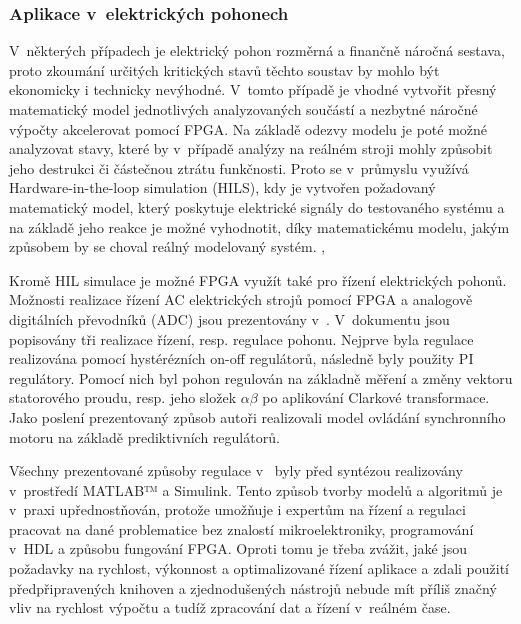 \documentclass[a4paper, twoside, 11pt]{article}
\begin{document}
			\subsubsection{Aplikace v~elektrických pohonech}
			V~některých případech je elektrický pohon rozměrná a finančně náročná sestava, proto zkoumání určitých kritických stavů těchto soustav by mohlo být ekonomicky i technicky nevýhodné. V~tomto případě je vhodné vytvořit přesný matematický model jednotlivých analyzovaných součástí a nezbytné náročné výpočty akcelerovat pomocí FPGA. Na základě odezvy modelu je poté možné analyzovat stavy, které by v~případě analýzy na reálném stroji mohly způsobit jeho destrukci či částečnou ztrátu funkčnosti. Proto se v~průmyslu využívá Hardware-in-the-loop simulation (HILS), kdy je vytvořen požadovaný matematický model, který poskytuje elektrické signály do testovaného systému a na základě jeho reakce je možné vyhodnotit, díky matematickému modelu, jakým způsobem by se choval reálný modelovaný systém. \cite{andina-advanced-features-and-industrial-applications-of-fpga}, \cite{mathworks-discovery-hil-simulation}\par
			Kromě HIL simulace je možné FPGA využít také pro řízení elektrických pohonů. Možnosti realizace řízení AC elektrických strojů pomocí FPGA a analogově digitálních převodníků (ADC) jsou prezentovány v~\cite{naouar-fpga-based-current-controllers-for-ac-machine-drives}. V~dokumentu jsou popisovány tři realizace řízení, resp. regulace pohonu. Nejprve byla regulace realizována pomocí hystérézních on-off regulátorů, následně byly použity PI regulátory. Pomocí nich byl pohon regulován na základně měření a změny vektoru statorového proudu, resp. jeho složek $\alpha \beta$ po aplikování Clarkové transformace. Jako poslení prezentovaný způsob autoři realizovali model ovládání synchronního motoru na základě prediktivních regulátorů. \cite{naouar-fpga-based-current-controllers-for-ac-machine-drives}\par Všechny prezentované způsoby regulace v~\cite{naouar-fpga-based-current-controllers-for-ac-machine-drives} byly před syntézou realizovány v~prostředí MATLAB™️ a Simulink. Tento způsob tvorby modelů a algoritmů je v~praxi upřednostňován, protože umožňuje i expertům na řízení a regulaci pracovat na dané problematice bez znalostí mikroelektroniky, programování v~HDL a způsobu fungování FPGA. Oproti tomu je třeba zvážit, jaké jsou požadavky na rychlost, výkonnost a optimalizované řízení aplikace a zdali použití předpřipravených knihoven a zjednodušených nástrojů nebude mít příliš značný vliv na rychlost výpočtu a tudíž zpracování dat a řízení v~reálném čase.~\cite{naouar-fpga-based-current-controllers-for-ac-machine-drives}
			
\end{document}
